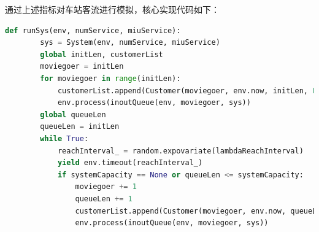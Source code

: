 通过上述指标对车站客流进行模拟，核心实现代码如下：
\begin{lstlisting}[breaklines=true,language=Python]
    def runSys(env, numService, miuService):
        sys = System(env, numService, miuService)
        global initLen, customerList
        moviegoer = initLen
        for moviegoer in range(initLen): 
            customerList.append(Customer(moviegoer, env.now, initLen, 0))
            env.process(inoutQueue(env, moviegoer, sys))
        global queueLen
        queueLen = initLen
        while True:
            reachInterval_ = random.expovariate(lambdaReachInterval)
            yield env.timeout(reachInterval_) 
            if systemCapacity == None or queueLen <= systemCapacity:
                moviegoer += 1
                queueLen += 1
                customerList.append(Customer(moviegoer, env.now, queueLen, reachInterval_))
                env.process(inoutQueue(env, moviegoer, sys))
\end{lstlisting}




